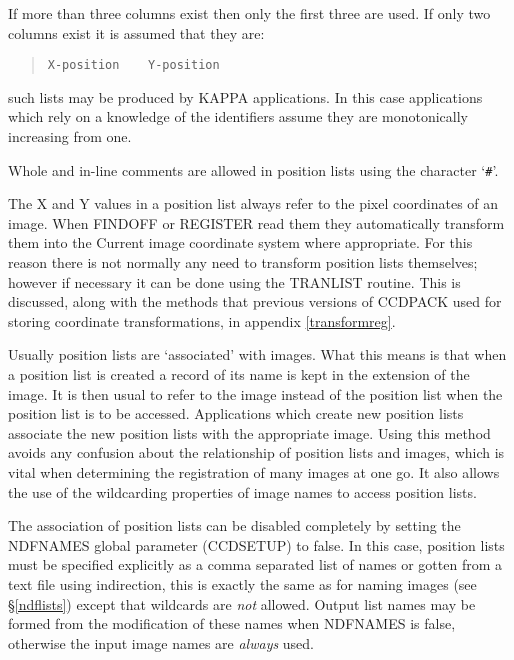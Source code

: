 \documentclass[twoside,11pt]{article}
\newcommand{\hyperref}[4]{#2\ref{#4}#3}
\newcommand{\htmlref}[2]{#1}
\newcommand{\xref}[3]{#1}
\renewcommand{\_}{\texttt{\symbol{95}}}
\newenvironment{myquote}{\begin{quote}\begin{small}}{\end{small}\end{quote}}
\newcommand{\routine}[1]{{\sc #1}}
\newcommand{\xroutine}[1]{\htmlref{{\sc #1}}{#1}}
\begin{document}
If more than three columns exist then only the first three are used.
If only two columns exist it is assumed that they are:
\begin{myquote}
\begin{verbatim}
X-position    Y-position
\end{verbatim}
\end{myquote}
such lists may be produced by \xref{KAPPA}{sun95}{} applications. In
this case applications which rely on a knowledge of the identifiers
assume they are monotonically increasing from one.

Whole and in-line comments are allowed in position lists using the
character `{\tt \#}'.

The X and Y values in a position list always refer to the 
pixel coordinates of an image.
When \routine{FINDOFF} or \routine{REGISTER} read them they
automatically transform them into the Current image coordinate system
where appropriate.
For this reason there is not normally any need to transform position
lists themselves; however if necessary it can be done using the
\xroutine{TRANLIST} routine.  This is discussed, along with the
methods that previous versions of CCDPACK used 
for storing coordinate transformations,
in appendix \ref{transformreg}.

Usually position lists are `associated' with images. What this means is
that when a position list is created a record of its name is kept in the
extension of the image. It is then usual to refer to the image instead of
the position list when the position list is to be accessed. Applications
which create new position lists associate the new position lists with
the appropriate image. Using this method avoids any confusion about the
relationship of position lists and images, which is vital when determining
the registration of many images at one go. It also allows the use of the
wildcarding properties of image names to access position lists.

The association of position lists can be disabled completely by setting
the NDFNAMES global parameter
(\xroutine{CCDSETUP}) to false. In this case, position lists must be specified
explicitly as a comma separated list of names or gotten from a text
file using indirection, this is exactly the same as for naming images
(see \hyperref{``processing lists of data''}{\S}{}{ndflists}) except that
wildcards are {\em not} allowed. Output list names may be formed
from the modification of these names when NDFNAMES is false, otherwise
the input image names are {\em always} used.
\end{document}
